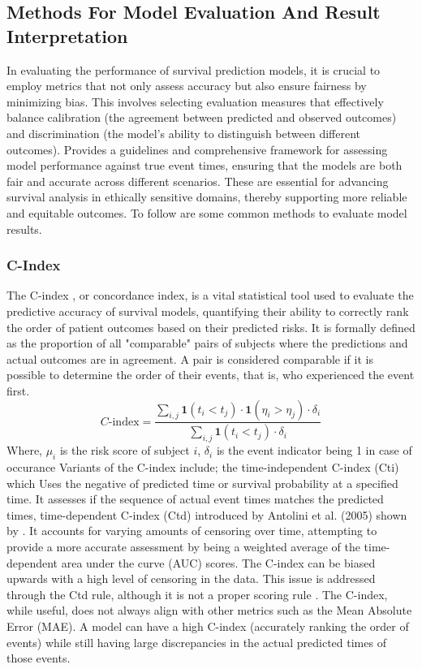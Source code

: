 \subsection{Methods For Model Evaluation And Result Interpretation} \label{eval}
In evaluating the performance of survival prediction models, it is crucial to employ metrics that not only assess accuracy but also ensure fairness by minimizing bias. This involves selecting evaluation measures that effectively balance calibration (the agreement between predicted and observed outcomes) and discrimination (the model's ability to distinguish between different outcomes). \parencite{sonabend_flexible_2022} Provides a guidelines and comprehensive framework for assessing model performance against true event times, ensuring that the models are both fair and accurate across different scenarios. These are essential for advancing survival analysis in ethically sensitive domains, thereby supporting more reliable and equitable outcomes. To follow are some common methods to evaluate model results.

\subsubsection{C-Index}
\noindent The C-index \parencite{qi_effective_2023}, or concordance index, is a vital statistical tool used to evaluate the predictive accuracy of survival models, quantifying their ability to correctly rank the order of patient outcomes based on their predicted risks. It is formally defined as the proportion of all "comparable" pairs of subjects where the predictions and actual outcomes are in agreement. A pair is considered comparable if it is possible to determine the order of their events, that is, who experienced the event first.
\begin{equation} \label{eq:cindex}C\text{-index} = \frac{\sum_{i,j} \mathbf{1}(t_i < t_j) \cdot \mathbf{1}(\eta_i > \eta_j) \cdot \delta_i}{\sum_{i,j} \mathbf{1}(t_i < t_j) \cdot \delta_i}\end{equation}
\noindent Where, \(\mu_{i}\) is the risk score of subject \(i\), \(\delta_{i}\) is the event indicator being 1 in case of occurance
\noindent Variants of the C-index include; the time-independent C-index (Cti) which Uses the negative of predicted time or survival probability at a specified time. It assesses if the sequence of actual event times matches the predicted times, time-dependent C-index (Ctd) introduced by Antolini et al. (2005) shown by \parencite{qi_effective_2023}. It accounts for varying amounts of censoring over time, attempting to provide a more accurate assessment by being a weighted average of the time-dependent area under the curve (AUC) scores. The C-index can be biased upwards with a high level of censoring in the data. This issue is addressed through the Ctd rule, although it is not a proper scoring rule \parencite{qi_effective_2023}. The C-index, while useful, does not always align with other metrics such as the Mean Absolute Error (MAE). A model can have a high C-index (accurately ranking the order of events) while still having large discrepancies in the actual predicted times of those events.

